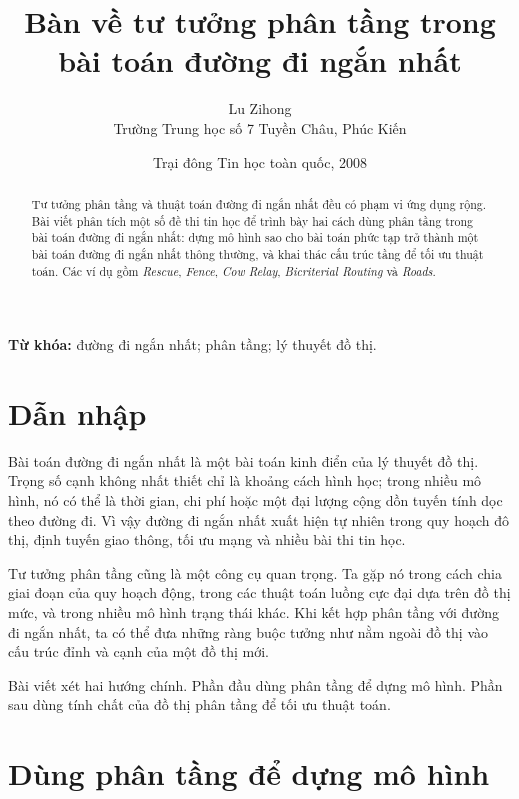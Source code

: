 \documentclass[11pt]{article}
\title{Bàn về tư tưởng phân tầng trong bài toán đường đi ngắn nhất}
\author{Lu Zihong\\Trường Trung học số 7 Tuyền Châu, Phúc Kiến}
\date{Trại đông Tin học toàn quốc, 2008}
\begin{document}
\maketitle


\renewcommand{\abstractname}{Tóm tắt}
\begin{abstract}
Tư tưởng phân tầng và thuật toán đường đi ngắn nhất đều có phạm vi ứng dụng
rộng. Bài viết phân tích một số đề thi tin học để trình bày hai cách dùng
phân tầng trong bài toán đường đi ngắn nhất: dựng mô hình sao cho bài toán
phức tạp trở thành một bài toán đường đi ngắn nhất thông thường, và khai thác
cấu trúc tầng để tối ưu thuật toán. Các ví dụ gồm \textit{Rescue}, \textit{Fence},
\textit{Cow Relay}, \textit{Bicriterial Routing} và \textit{Roads}.
\end{abstract}

\noindent\textbf{Từ khóa:} đường đi ngắn nhất; phân tầng; lý thuyết đồ thị.

\section{Dẫn nhập}

Bài toán đường đi ngắn nhất là một bài toán kinh điển của lý thuyết đồ thị.
Trọng số cạnh không nhất thiết chỉ là khoảng cách hình học; trong nhiều mô
hình, nó có thể là thời gian, chi phí hoặc một đại lượng cộng dồn tuyến tính
dọc theo đường đi. Vì vậy đường đi ngắn nhất xuất hiện tự nhiên trong quy
hoạch đô thị, định tuyến giao thông, tối ưu mạng và nhiều bài thi tin học.

Tư tưởng phân tầng cũng là một công cụ quan trọng. Ta gặp nó trong cách chia
giai đoạn của quy hoạch động, trong các thuật toán luồng cực đại dựa trên đồ
thị mức, và trong nhiều mô hình trạng thái khác. Khi kết hợp phân tầng với
đường đi ngắn nhất, ta có thể đưa những ràng buộc tưởng như nằm ngoài đồ thị
vào cấu trúc đỉnh và cạnh của một đồ thị mới.

Bài viết xét hai hướng chính. Phần đầu dùng phân tầng để dựng mô hình. Phần
sau dùng tính chất của đồ thị phân tầng để tối ưu thuật toán.

\section{Dùng phân tầng để dựng mô hình}
\end{document}
